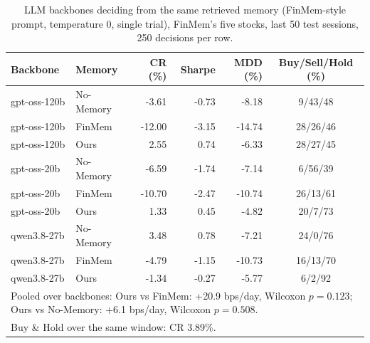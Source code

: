 \begin{table}[ht]
\centering
\caption{LLM backbones deciding from the same retrieved memory (FinMem-style prompt, temperature 0, single trial), FinMem's five stocks, last 50 test sessions, 250 decisions per row.}
\label{tab:llm}
\small
\begin{tabular}{llrrrc}
\hline
Backbone & Memory & CR (\%) & Sharpe & MDD (\%) & Buy/Sell/Hold (\%) \\
\hline
gpt-oss-120b & No-Memory & -3.61 & -0.73 & -8.18 & 9/43/48 \\
gpt-oss-120b & FinMem & -12.00 & -3.15 & -14.74 & 28/26/46 \\
gpt-oss-120b & Ours & 2.55 & 0.74 & -6.33 & 28/27/45 \\
\hline
gpt-oss-20b & No-Memory & -6.59 & -1.74 & -7.14 & 6/56/39 \\
gpt-oss-20b & FinMem & -10.70 & -2.47 & -10.74 & 26/13/61 \\
gpt-oss-20b & Ours & 1.33 & 0.45 & -4.82 & 20/7/73 \\
\hline
qwen3.8-27b & No-Memory & 3.48 & 0.78 & -7.21 & 24/0/76 \\
qwen3.8-27b & FinMem & -4.79 & -1.15 & -10.73 & 16/13/70 \\
qwen3.8-27b & Ours & -1.34 & -0.27 & -5.77 & 6/2/92 \\
\hline
\multicolumn{6}{p{0.9\textwidth}}{\footnotesize Pooled over backbones: Ours vs FinMem: +20.9 bps/day, Wilcoxon $p=0.123$; Ours vs No-Memory: +6.1 bps/day, Wilcoxon $p=0.508$.} \\
\multicolumn{6}{p{0.9\textwidth}}{\footnotesize Buy \& Hold over the same window: CR 3.89\%.} \\
\hline
\end{tabular}
\end{table}
